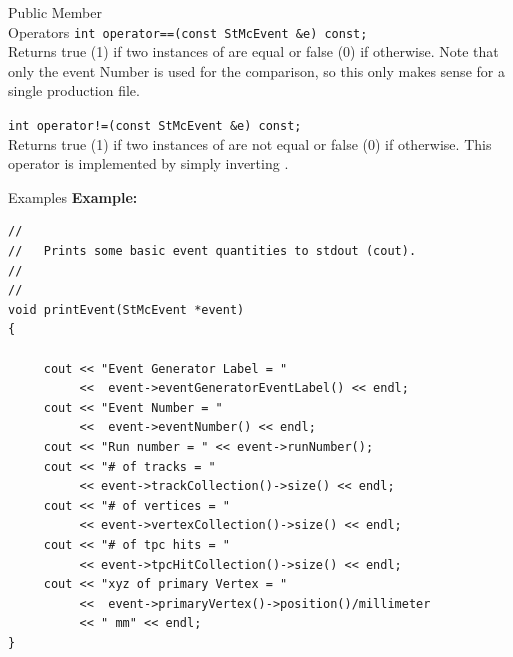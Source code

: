 \begin{Entry}
\item[Public Member\\ Operators]
    \verb+int operator==(const StMcEvent &e) const;+ \\
    Returns true (1) if two instances of  are equal or false (0)
    if otherwise.
    Note that only the event Number is used for the comparison, so this only makes
    sense for a single production file.

    \verb+int operator!=(const StMcEvent &e) const;+ \\
    Returns true (1) if two instances of  are not equal or false (0)
    if otherwise.
    This operator is implemented by simply inverting .

\item[Examples]
{\bf Example:}
{\footnotesize
\begin{verbatim}
//
//   Prints some basic event quantities to stdout (cout).
//   
//
void printEvent(StMcEvent *event)
{
     
     cout << "Event Generator Label = "
          <<  event->eventGeneratorEventLabel() << endl;
     cout << "Event Number = "
          <<  event->eventNumber() << endl;
     cout << "Run number = " << event->runNumber();
     cout << "# of tracks = "
          << event->trackCollection()->size() << endl;
     cout << "# of vertices = "
          << event->vertexCollection()->size() << endl;
     cout << "# of tpc hits = "
          << event->tpcHitCollection()->size() << endl;
     cout << "xyz of primary Vertex = "
          <<  event->primaryVertex()->position()/millimeter
          << " mm" << endl;
}

\end{verbatim}
}%


\end{Entry}

%
%

